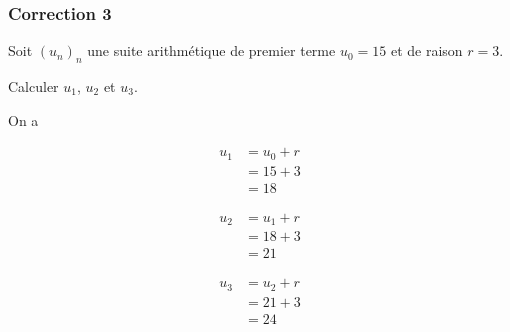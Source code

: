 \documentclass[15pt, mathserif]{beamer}
\begin{document}
\begin{frame}
\vspace{-10mm}
	\frametitle{Correction 3}
Soit $(u_n)_n$ une suite arithmétique de premier terme $u_0=15$ et de raison $r=3$. 
 
 Calculer $u_1$, $u_2$ et $u_3$. 
 
 On a 
 \begin{minipage}{0.25\textwidth} 
 
 \begin{align*} 
 u_1 &= u_0+r \\ &= 15+3 \\ &=18
 \end{align*} 
  
 \end{minipage} \hfil \begin{minipage}{0.25\textwidth} 
 
 \begin{align*} 
 u_2 &= u_1+r \\ &= 18+3 \\ &=21
 \end{align*} 
 
 \end{minipage} \hfil \begin{minipage}{0.25\textwidth} 
 
 \begin{align*} 
 u_3 &= u_2+r \\ &= 21+3 \\ &=24
 \end{align*} 
 
 \end{minipage} 
\end{frame}
\end{document}

